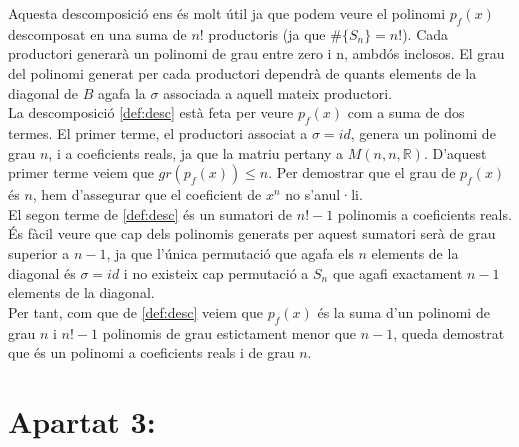\documentclass[a4paper, 11pt]{article}
\newcommand{\R}{\mathbb{R}}
\begin{document}
    Aquesta descomposici\'o ens \'es molt \'util ja que podem veure el polinomi $p_f(x)$ descomposat en una suma de $n!$ productoris (ja que $\#\{S_n\} = n!$). Cada productori generar\`a un polinomi de grau entre zero i n, ambd\'os inclosos. El grau del polinomi generat per cada productori dependr\`a de quants elements de la diagonal de $B$ agafa la $\sigma$ associada a aquell mateix productori.\\
    La descomposici\'o \eqref{def:desc} est\`a feta per veure $p_f(x)$ com a suma de dos termes. El primer terme, el productori associat a $\sigma = id$, genera un polinomi de grau $n$, i a coeficients reals, ja que la matriu pertany a $M(n,n,\R)$. D'aquest primer terme veiem que $gr(p_f(x)) \leq n$. Per demostrar que el grau de $p_f(x)$ \'es $n$, hem d'assegurar que el coeficient de $x^n$ no s'anul·li.\\
    El segon terme de \eqref{def:desc} \'es un sumatori de $n!-1$ polinomis a coeficients reals. \'Es f\`acil veure que cap dels polinomis generats per aquest sumatori ser\`a de grau superior a $n-1$, ja que l'\'unica permutaci\'o que agafa els $n$ elements de la diagonal \'es $\sigma = id$ i no existeix cap permutaci\'o a $S_n$ que agafi exactament $n-1$ elements de la diagonal.\\
    Per tant, com que de \eqref{def:desc} veiem que $p_f(x)$ \'es la suma d'un polinomi de grau $n$ i $n!-1$ polinomis de grau estictament menor que $n-1$, queda demostrat que \'es un polinomi a coeficients reals i de grau $n$.
    \section*{Apartat 3:}
\end{document}
